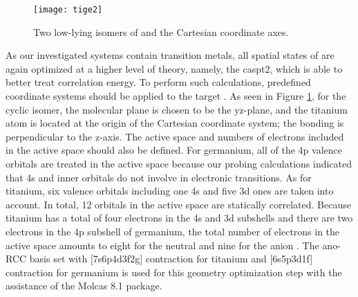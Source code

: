 \begin{refsection}
\begin{figure}[htb!]
	\centering
	\texttt{[image: tige2]}
	\caption{Two low-lying isomers of  and the Cartesian coordinate axes.}
	\label{fig4:tige2}
\end{figure} 



As our investigated systems contain transition metals, all spatial states of  are again optimized at a higher level of theory, namely, the \acrshort{caspt2}, \cite{c4:30} which is able to better treat correlation energy. To perform such calculations, predefined coordinate systems should be applied to the target . As seen in Figure \ref{fig4:tige2}, for the cyclic isomer, the molecular plane is chosen to be the yz-plane, and the titanium atom is located at the origin of the Cartesian coordinate system; the  bonding is perpendicular to the z-axis. The active space and numbers of electrons included in the active space should also be defined. For germanium, all of the 4p valence orbitals are treated in the active space because our probing calculations indicated that 4s and inner orbitals do not involve in electronic transitions. As for titanium, six valence orbitals including one 4s and five 3d ones are taken into account. In total, 12 orbitals in the active space are statically correlated. Because titanium has a total of four electrons in the 4s and 3d subshells and there are two electrons in the 4p subshell of germanium, the total number of electrons in the active space amounts to eight for the neutral  and nine for the anion . The \acrshort{ano}-RCC basis set with [7s6p4d3f2g] contraction for titanium \cite{c4:31} and [6s5p3d1f] contraction for germanium \cite{c4:32} is used for this geometry optimization step with the assistance of the Molcas 8.1 package. \cite{33}







\end{refsection}
